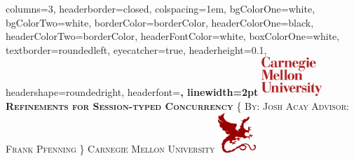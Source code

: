 \documentclass[landscape,a0paper,fontscale=0.290]{baposter} %
\begin{document}
\begin{poster}
{
columns=3,
headerborder=closed, %
colspacing=1em, %
bgColorOne=white, %
bgColorTwo=white, %
borderColor=borderColor, %
headerColorOne=black, %
headerColorTwo=borderColor, %
headerFontColor=white, %
boxColorOne=white, %
textborder=roundedleft, %
eyecatcher=true, %
headerheight=0.1\textheight, %
headershape=roundedright, %
headerfont=\Large\bf\textsc, %
linewidth=2pt %
}
%
{\includegraphics[height=4em]{cmu_logo.jpg}} %
{\bf\textsc{Refinements for Session-typed Concurrency}\vspace{0.5em}} %
{\textsc{\{ By: Josh Acay \hspace{6pt} Advisor: Frank Pfenning \} \hspace{12pt} Carnegie Mellon University}} %
{\includegraphics[height=4em]{scs_logo.png}} %



\end{poster}
\end{document}
